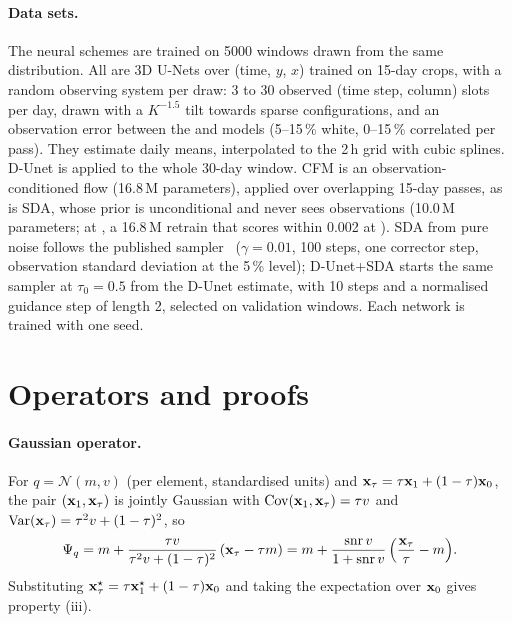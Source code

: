 \paragraph{Data sets.}
The neural schemes are trained on 5000 windows drawn from the same distribution. All are
3D U-Nets over (time, $y$, $x$) trained on 15-day crops, with a random observing system per
draw: 3 to 30 observed (time step, column) slots per day, drawn with a $K^{-1.5}$ tilt towards
sparse configurations, and an observation error between the \Sz{} and \So{} models (5--15\,\%
white, 0--15\,\% correlated per pass). They estimate daily means, interpolated to the 2\,h grid
with cubic splines. D-Unet is applied to the whole 30-day window. CFM is an
observation-conditioned flow (16.8\,M parameters), applied over overlapping 15-day passes, as is
SDA, whose prior is unconditional and never sees observations (10.0\,M parameters; at \So, a
16.8\,M retrain that scores within 0.002 at \Sz). SDA from pure noise follows the published
sampler~\cite{rozet_score-based_2023} ($\gamma = 0.01$, 100 steps, one corrector step,
observation standard deviation at the 5\,\% \Sz{} level); D-Unet+SDA starts the same sampler at
$\tau_0 = 0.5$ from the D-Unet estimate, with 10 steps and a normalised guidance step of length
2, selected on validation windows. Each network is trained with one seed.


\section{Operators and proofs}\label{app:proofs}

\paragraph{Gaussian operator.}
For $q = \mathcal{N}(m, v)$ (per element, standardised units) and $\mathbf{x}_\tau = \tau
\mathbf{x}_1 + (1-\tau)\mathbf{x}_0$, the pair $(\mathbf{x}_1, \mathbf{x}_\tau)$ is jointly Gaussian with
$\operatorname{Cov}(\mathbf{x}_1, \mathbf{x}_\tau) = \tau v$ and $\mathrm{Var}(\mathbf{x}_\tau) = \tau^2 v +
(1-\tau)^2$, so
\begin{equation}
  \Psi_q = m + \frac{\tau v}{\tau^2 v + (1-\tau)^2}\,(\mathbf{x}_\tau - \tau m)
         = m + \frac{\mathrm{snr}\, v}{1 + \mathrm{snr}\, v}\,\Big(\frac{\mathbf{x}_\tau}{\tau} - m\Big).
\end{equation}
Substituting $\mathbf{x}_\tau^\star = \tau\mathbf{x}_1^\star + (1-\tau)\mathbf{x}_0$ and taking the expectation over $\mathbf{x}_0$ gives property (iii).

